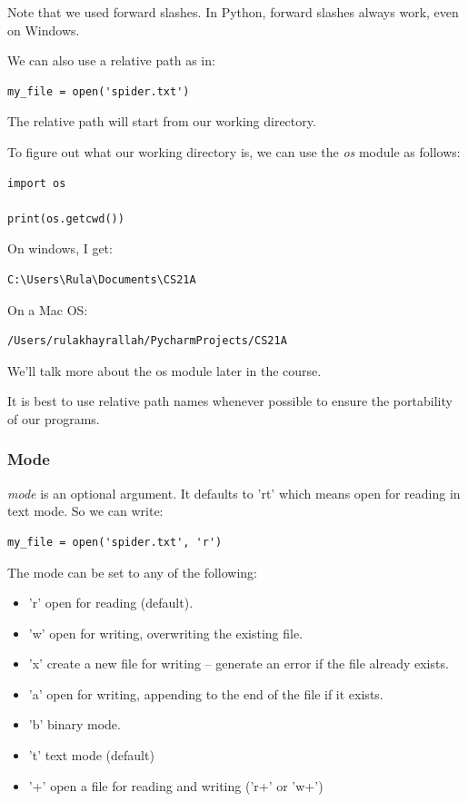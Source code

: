 \documentclass{article}
\begin{document}
Note that we used forward slashes. In Python, forward slashes always work, even on Windows.

We can also use a relative path as in:

\begin{lstlisting}
my_file = open('spider.txt')
\end{lstlisting}

The relative path will start from our working directory.  

To  figure out what our working directory is, we can use the \textit{os} module as follows:

\begin{lstlisting}
import os

print(os.getcwd())  
\end{lstlisting}

On windows, I get:

\begin{lstlisting}
C:\Users\Rula\Documents\CS21A
\end{lstlisting}

On a Mac OS:

\begin{lstlisting}
/Users/rulakhayrallah/PycharmProjects/CS21A
\end{lstlisting}

We’ll talk more about the os module later in the course.

It is best to use relative path names whenever possible to ensure the portability of our programs.  

\subsubsection{Mode}

\textit{mode} is an optional argument.   It defaults to 'rt' which means open for reading in text mode. So we can write:

\begin{lstlisting}
my_file = open('spider.txt', 'r')
\end{lstlisting}

The mode can be set to any of the following:
\begin{itemize}
\item 'r' open for reading (default).

\item 'w' open for writing, overwriting the existing file. 

\item 'x' create a new file for writing – generate an error if the file already exists.

\item 'a' open for writing, appending to the end of the  file if  it exists.

\item 'b'   binary mode.

\item 't'  text mode (default)

\item '+' open a file for reading and writing ('r+' or 'w+')
\end{itemize}
\end{document}

